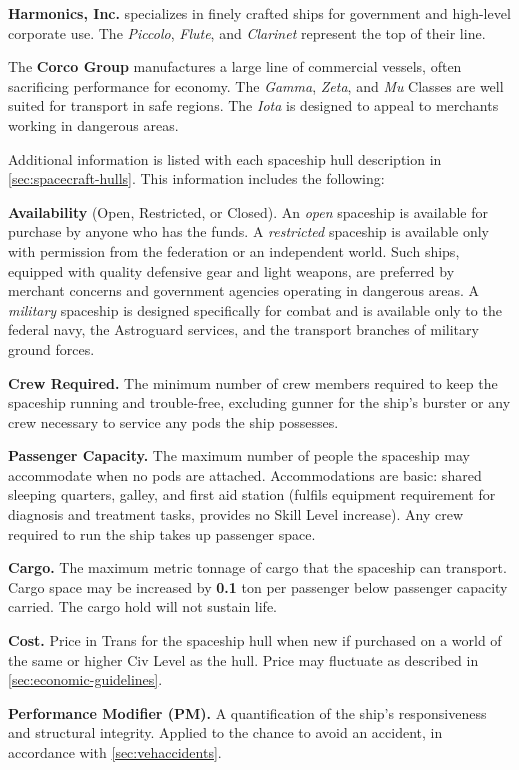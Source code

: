 \textbf{Harmonics, Inc.} specializes in finely crafted ships for
government and high-level corporate use. The \emph{Piccolo},
\emph{Flute}, and \emph{Clarinet} represent the top of their line.

The \textbf{Corco Group} manufactures a large line of commercial
vessels, often sacrificing performance for economy. The \emph{Gamma},
\emph{Zeta}, and \emph{Mu} Classes are well suited for transport in
safe regions. The \emph{Iota} is designed to appeal to merchants
working in dangerous areas.


Additional information is listed with each spaceship hull description
in \ref{sec:spacecraft-hulls}. This information includes the following:

\textbf{Availability} (Open, Restricted, or Closed). An \emph{open}
spaceship is available for purchase by anyone who has the funds. A
\emph{restricted} spaceship is available only with permission from the
federation or an independent world. Such ships, equipped with quality
defensive gear and light weapons, are preferred by merchant concerns
and government agencies operating in dangerous areas. A
\emph{military} spaceship is designed specifically for combat and is
available only to the federal navy, the Astroguard services, and the
transport branches of military ground forces.

\textbf{Crew Required.} The minimum number of crew members required to
keep the spaceship running and trouble-free, excluding gunner for the
ship's burster or any crew necessary to service any pods the ship
possesses.

\textbf{Passenger Capacity.} The maximum number of people the
spaceship may accommodate when no pods are attached. Accommodations
are basic: shared sleeping quarters, galley, and first aid station
(fulfils equipment requirement for diagnosis and treatment tasks,
provides no Skill Level increase). Any crew required to run the ship
takes up passenger space.

\textbf{Cargo.} The maximum metric tonnage of cargo that the spaceship can
transport. Cargo space may be increased by \textbf{0.1} ton per
passenger below passenger capacity carried. The cargo hold will not
sustain life.

\textbf{Cost.} Price in Trans for the spaceship hull when new if
purchased on a world of the same or higher Civ Level as the hull.
Price may fluctuate as described in \ref{sec:economic-guidelines}.

\textbf{Performance Modifier (PM).} A quantification of the ship's
responsiveness and structural integrity. Applied to the chance to
avoid an accident, in accordance with \ref{sec:vehaccidents}.

